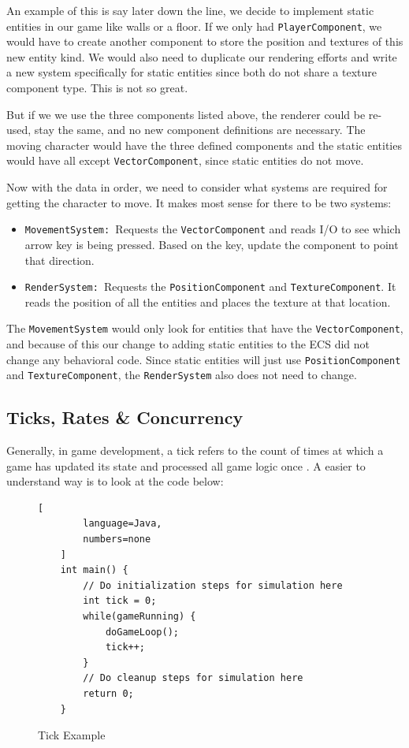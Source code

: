An example of this is say later down the line, we decide to implement static entities in our game like walls or a floor. If we only had \texttt{PlayerComponent}, we would have to create another component to store the position and textures of this new entity kind. We would also need to duplicate our rendering efforts and write a new system specifically for static entities since both do not share a texture component type. This is not so great. 

But if we we use the three components listed above, the renderer could be re-used, stay the same, and no new component definitions are necessary. The moving character would have the three defined components and the static entities would have all except \texttt{VectorComponent}, since static entities do not move.

Now with the data in order, we need to consider what systems are required for getting the character to move. It makes most sense for there to be two systems:

\begin{itemize}
    \item \texttt{MovementSystem: }Requests the \texttt{VectorComponent} and reads I/O to see which arrow key is being pressed. Based on the key, update the component to point that direction.
    \item \texttt{RenderSystem: }Requests the \texttt{PositionComponent} and \texttt{TextureComponent}. It reads the position of all the entities and places the texture at that location. 
\end{itemize}

The \texttt{MovementSystem} would only look for entities that have the \texttt{VectorComponent}, and because of this our change to adding static entities to the ECS did not change any behavioral code. Since static entities will just use \texttt{PositionComponent} and \texttt{TextureComponent}, the \texttt{RenderSystem} also does not need to change.

\subsection{Ticks, Rates \& Concurrency}
Generally, in game development, a tick refers to the count of times at which a game has updated its state and processed all game logic once \cite{Gregory_2018}. A easier to understand way is to look at the code below: 

\begin{figure}[H]
    \begin{lstlisting}[
        language=Java,
        numbers=none
    ]
    int main() {
        // Do initialization steps for simulation here
        int tick = 0;
        while(gameRunning) {
            doGameLoop();
            tick++;
        }
        // Do cleanup steps for simulation here
        return 0;
    }
\end{lstlisting}
    \caption{Tick Example}
    \label{code:naive_ecs_data}
\end{figure}

